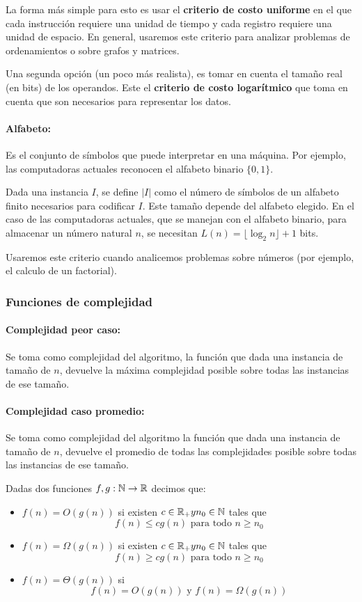La forma más simple para esto es usar el \textbf{criterio de costo uniforme} en el que cada instrucción requiere una unidad de tiempo y cada registro requiere una unidad de espacio. En general, usaremos este criterio para analizar problemas de ordenamientos o sobre grafos y matrices.


Una segunda opción (un poco más realista), es tomar en cuenta el tamaño real (en bits) de los operandos. Este el \textbf{criterio de costo logarítmico} que toma en cuenta que son necesarios para representar los datos. 
\paragraph{Alfabeto:} Es el conjunto de símbolos que puede interpretar en una máquina. Por ejemplo, las computadoras actuales reconocen el alfabeto binario \(\{0,1\}\).

\vspace*{5mm}
Dada una instancia \(I\), se define \(|I|\) como el número de símbolos de un alfabeto finito necesarios para codificar \(I\). Este tamaño depende del alfabeto elegido.  En el caso de las computadoras actuales, que se manejan con el alfabeto binario, para almacenar un número natural \(n\), se necesitan \(L(n) = \lfloor\log_2{n}\rfloor + 1\) bits.

Usaremos este criterio cuando analicemos problemas sobre números (por ejemplo, el calculo de un factorial).

\subsubsection{Funciones de complejidad}
\paragraph{Complejidad peor caso:} Se toma como complejidad del algoritmo, la función que dada una instancia de tamaño de $n$, devuelve la máxima complejidad posible sobre todas las instancias de ese tamaño.

\paragraph{Complejidad caso promedio:} Se toma como complejidad del algoritmo la función que dada una instancia de tamaño de $n$, devuelve el promedio de todas las complejidades posible sobre todas las instancias de ese tamaño.

\vspace*{5mm}
Dadas dos funciones \(f,g:\mathbb{N}\to\mathbb{R}\) decimos que:
\begin{itemize}
	\item \(f(n) = O(g(n))\) si existen \(c\in\mathbb{R}_+ y n_0\in\mathbb{N}\) tales que
	\[f(n)\leq cg(n) \text{ para todo } n\geq n_0\]
	\item \(f(n) = \Omega(g(n))\) si existen \(c\in\mathbb{R}_+ y n_0\in\mathbb{N}\) tales que
	\[f(n)\geq cg(n) \text{ para todo } n\geq n_0\]
	\item \(f(n) = \Theta(g(n))\) si \[f(n) = O(g(n)) \text{ y } f(n)= \Omega(g(n))\]
\end{itemize}

